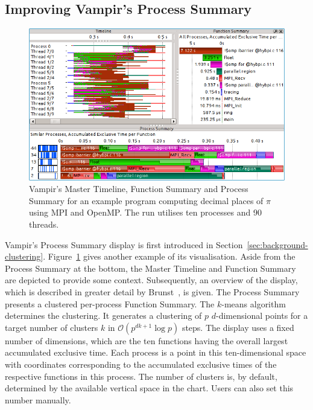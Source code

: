 \documentclass[a4paper, final, diplominf]{zih-template}
\begin{document}
\subsection{Improving Vampir's Process Summary}
\label{sec:evaluation-visualisations-process}
\begin{figure}[b!]
	\centering
	\includegraphics[width=13.08cm]{pi-ring-100p-hybrid-process-summary}
	\caption{Vampir's Master Timeline, Function Summary and Process Summary for an example program computing decimal places of $\pi$ using MPI and OpenMP. The run utilises ten processes and 90 threads.}
	\label{fig:pi-ring-100p-hybrid-process-summary}
\end{figure}
Vampir's Process Summary display is first introduced in Section~\ref{sec:background-clustering}.
Figure~\ref{fig:pi-ring-100p-hybrid-process-summary} gives another example of its visualisation.
Aside from the Process Summary at the bottom, the Master Timeline and Function Summary are depicted to provide some context.
Subsequently, an overview of the display, which is described in greater detail by Brunst~\cite{brunst07}, is given.
The Process Summary presents a clustered per-process Function Summary.
The $k$-means algorithm~\cite{forgy65, lloyd82, macqueen67, steinhaus56} determines the clustering.
It generates a clustering of $p$ $d$-dimensional points for a target number of clusters $k$ in $\mathcal{O}(p^{dk+1} \log p)$ steps.
The display uses a fixed number of dimensions, which are the ten functions having the overall largest accumulated exclusive time.
Each process is a point in this ten-dimensional space with coordinates corresponding to the accumulated exclusive times of the respective functions in this process.
The number of clusters is, by default, determined by the available vertical space in the chart.
Users can also set this number manually.
\end{document}
